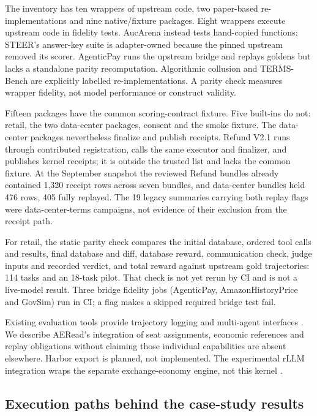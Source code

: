 The inventory has ten wrappers of upstream code, two paper-based
re-implementations and nine native/fixture packages. Eight wrappers
execute upstream code in fidelity tests. AucArena instead tests
hand-copied functions; STEER's answer-key suite is adapter-owned
because the pinned upstream removed its scorer. AgenticPay runs the
upstream bridge and replays goldens but lacks a standalone parity
recomputation. Algorithmic collusion and TERMS-Bench are explicitly
labelled re-implementations. A parity check measures wrapper fidelity,
not model performance or construct validity.

Fifteen packages have the common scoring-contract fixture. Five
built-ins do not: retail, the two data-center packages, consent and the
smoke fixture. The data-center packages nevertheless finalize and
publish receipts. Refund V2.1 runs through contributed registration,
calls the same executor and finalizer, and publishes kernel receipts;
it is outside the trusted list and lacks the common fixture. At the
September snapshot the reviewed Refund bundles already contained
1,320 receipt rows across seven bundles, and data-center bundles held
476 rows, 405 fully replayed. The 19 legacy summaries carrying both
replay flags were data-center-terms campaigns, not evidence of their
exclusion from the receipt path.

For retail, the static parity check compares the initial database,
ordered tool calls and results, final database and diff, database reward,
communication check, judge inputs and recorded verdict, and total
reward against upstream gold trajectories: 114 tasks and an 18-task
pilot. That check is not yet rerun by CI and is not a live-model result.
Three bridge fidelity jobs (AgenticPay, AmazonHistoryPrice and GovSim)
run in CI; a flag makes a skipped required bridge test fail.

Existing evaluation tools provide trajectory logging and multi-agent
interfaces \citep{ukaisi2024inspect,terry2021pettingzoo,
lanctot2019openspiel,agapiou2022meltingpot}. We describe AERead's
integration of seat assignments, economic references and replay
obligations without claiming those individual capabilities are absent
elsewhere. Harbor export is planned, not implemented. The experimental
rLLM integration wraps the separate exchange-economy engine, not this
kernel \citep{laude2026harbor,agentica2025rllm}.



\subsection{Execution paths behind the case-study results}
\label{app:runtime-cases}

